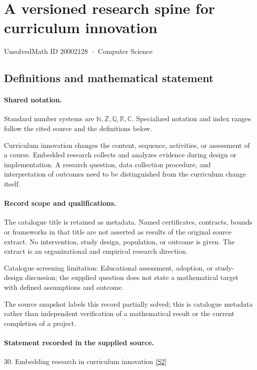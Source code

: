 \documentclass[11pt]{article}
\newcommand{\sref}[2]{\hyperlink{source:#1:#2}{[S#2]}}
\begin{document}
\setcounter{section}{20002127}
\section{A versioned research spine for curriculum innovation}\label{20002128}
{\small\sffamily UnsolvedMath ID 20002128 · Computer Science}
\subsection{Definitions and mathematical statement}

\paragraph{Shared notation.}Standard number systems are $\mathbb N,\mathbb Z,\mathbb Q,\mathbb R,\mathbb C$. Specialized notation and index ranges follow the cited source and the definitions below.


Curriculum innovation changes the content, sequence, activities, or assessment of a course. Embedded research collects and analyzes evidence during design or implementation. A research question, data collection procedure, and interpretation of outcomes need to be distinguished from the curriculum change itself.
\paragraph{Record scope and qualifications.}
The catalogue title is retained as metadata. Named certificates, contracts, bounds or frameworks in that title are not asserted as results of the original source extract.
No intervention, study design, population, or outcome is given. The extract is an organizational and empirical research direction.

Catalogue screening limitation: Educational assessment, adoption, or study-design discussion; the supplied question does not state a mathematical target with defined assumptions and outcome.

The source snapshot labels this record partially solved; this is catalogue metadata rather than independent verification of a mathematical result or the current completion of a project.
\paragraph{Statement recorded in the supplied source.}
30. Embedding research in curriculum innovation \sref{20002128}{2}
\end{document}
